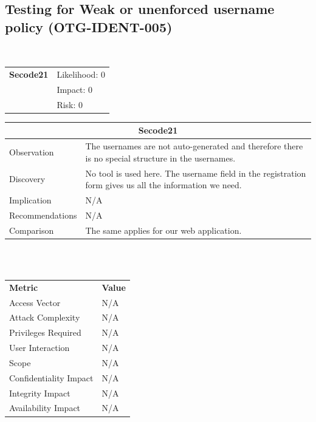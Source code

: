 \documentclass[headsepline,footsepline,footinclude=false,oneside,fontsize=11pt,paper=a4,listof=totoc,bibliography=totoc]{scrbook} %
\begin{document}
\subsection{Testing for Weak or unenforced username policy (OTG-IDENT-005)}\
\begin{tabular}{cR{12cm}}
	\textbf{Secode21} & Likelihood: 0\\& Impact: 0\\& Risk: 0
\end{tabular}

\begin{tabular}{ l|p{11cm}  }
	\hline
	\multicolumn{2}{c}{\textbf{Secode21}} \\
	\hline
	Observation   & The usernames are not auto-generated and therefore there is no special structure in the usernames. \\
	Discovery  & No tool is used here. The username field in the registration form gives us all the information we need. \\
	Implication    & N/A \\
	Recommendations & N/A \\
	Comparison & The same applies for our web application. \\
	\hline
\end{tabular}
\\
\vspace{0.5cm}
\\
\begin{center}
	\begin{tabular}{ll}
		\rowcolor[HTML]{34CDF9}
		{\color[HTML]{ECF4FF} \textbf{Metric}}        & {\color[HTML]{ECF4FF} \textbf{Value}} \\
		\rowcolor[HTML]{BBDAFF}
		{\color[HTML]{333333} Access Vector}          & {\color[HTML]{333333} } N/A              \\
		\rowcolor[HTML]{ECF4FF}
		{\color[HTML]{333333} Attack Complexity}      & {\color[HTML]{333333} } N/A              \\
		\rowcolor[HTML]{BBDAFF}
		{\color[HTML]{333333} Privileges Required}    & {\color[HTML]{333333} } N/A              \\
		\rowcolor[HTML]{ECF4FF}
		{\color[HTML]{333333} User Interaction}       & {\color[HTML]{333333} } N/A              \\
		\rowcolor[HTML]{BBDAFF}
		{\color[HTML]{333333} Scope}                  & {\color[HTML]{333333} } N/A              \\
		\rowcolor[HTML]{ECF4FF}
		{\color[HTML]{333333} Confidentiality Impact} & {\color[HTML]{333333} } N/A              \\
		\rowcolor[HTML]{BBDAFF}
		{\color[HTML]{333333} Integrity Impact}       & {\color[HTML]{333333} } N/A              \\
		\rowcolor[HTML]{ECF4FF}
		{\color[HTML]{333333} Availability Impact}    & {\color[HTML]{333333} } N/A
	\end{tabular}
\end{center}
\pagebreak
\end{document}
